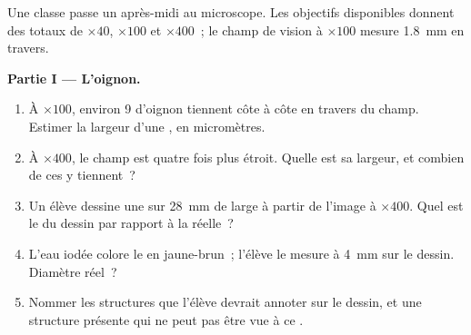 \begin{problem}
\label{pb:g10:cells-common-unit:1}
Une classe passe un après-midi au microscope. Les objectifs disponibles
donnent des  totaux de $\times 40$, $\times 100$ et
$\times 400$~; le champ de vision à $\times 100$ mesure \qty{1.8}{mm}
en travers.

\medskip
\noindent\textbf{Partie I --- L'oignon.}
\begin{enumerate}
  \item À $\times 100$, environ 9  d'oignon tiennent côte à
        côte en travers du champ. Estimer la largeur d'une , en
        micromètres.
  \item À $\times 400$, le champ est quatre fois plus étroit. Quelle
        est sa largeur, et combien de ces  y tiennent~?
  \item Un élève dessine une  sur \qty{28}{mm} de large à partir
        de l'image à $\times 400$. Quel est le  du dessin
        par rapport à la  réelle~?
  \item L'eau iodée colore le  en jaune-brun~; l'élève le mesure à
        \qty{4}{mm} sur le dessin. Diamètre réel~?
  \item Nommer les structures que l'élève devrait annoter sur le
        dessin, et une structure présente qui ne peut pas être vue à ce
        .
\end{enumerate}


\end{problem}

